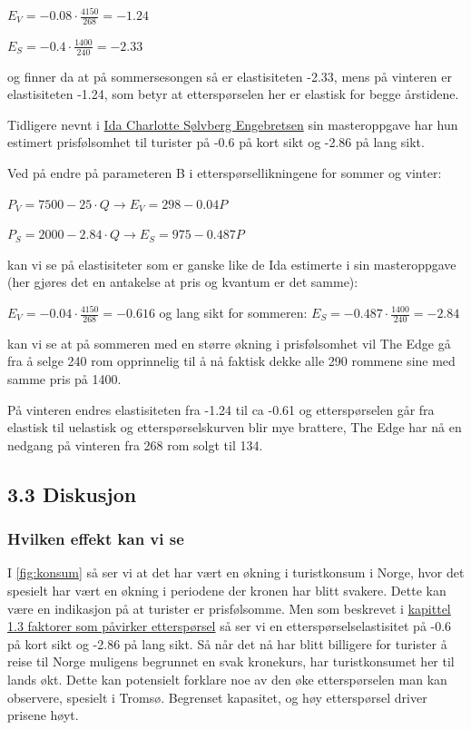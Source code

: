 \documentclass[
  12pt,
  a4paper,
  DIV=11,
  numbers=noendperiod]{scrartcl}
\begin{document}
\(E_V = -0.08 \cdot \frac{4150}{268} = -1.24\)

\(E_S = -0.4 \cdot \frac{1400}{240} = -2.33\)

og finner da at på sommersesongen så er elastisiteten -2.33, mens på
vinteren er elastisiteten -1.24, som betyr at etterspørselen her er
elastisk for begge årstidene.

Tidligere nevnt i
\href{https://ntnuopen.ntnu.no/ntnu-xmlui/bitstream/handle/11250/2486498/Masteroppgave\%20Ida\%20Charlotte\%20Engebretsen.pdf}{Ida Charlotte Sølvberg Engebretsen}
sin masteroppgave har hun estimert prisfølsomhet til turister på -0.6 på
kort sikt og -2.86 på lang sikt.

Ved på endre på parameteren B i etterspørsellikningene for sommer og
vinter:

\(P_V = 7500 - 25 \cdot Q \rightarrow E_V = 298 - 0.04P\)

\(P_S = 2000 -2.84 \cdot Q \rightarrow E_S = 975 - 0.487P\)

kan vi se på elastisiteter som er ganske like de Ida estimerte i sin
masteroppgave (her gjøres det en antakelse at pris og kvantum er det
samme):

\(E_V = -0.04 \cdot \frac{4150}{268} = -0.616\) og lang sikt for
sommeren: \(E_S = -0.487 \cdot \frac{1400}{240} = -2.84\)

kan vi se at på sommeren med en større økning i prisfølsomhet vil The
Edge gå fra å selge 240 rom opprinnelig til å nå faktisk dekke alle 290
rommene sine med samme pris på 1400.

På vinteren endres elastisiteten fra -1.24 til ca -0.61 og
etterspørselen går fra elastisk til uelastisk og etterspørselskurven
blir mye brattere, The Edge har nå en nedgang på vinteren fra 268 rom
solgt til 134.

\clearpage

\subsection{3.3 Diskusjon}\label{diskusjon}

\subsubsection{Hvilken effekt kan vi se}\label{hvilken-effekt-kan-vi-se}

I \autoref{fig:konsum} så ser vi at det har vært en økning i
turistkonsum i Norge, hvor det spesielt har vært en økning i periodene
der kronen har blitt svakere. Dette kan være en indikasjon på at
turister er prisfølsomme. Men som beskrevet i
\hyperlink{faktorer_ettersporsel}{kapittel 1.3 faktorer som påvirker etterspørsel}
så ser vi en etterspørselselastisitet på -0.6 på kort sikt og -2.86 på
lang sikt. Så når det nå har blitt billigere for turister å reise til
Norge muligens begrunnet en svak kronekurs, har turistkonsumet her til
lands økt. Dette kan potensielt forklare noe av den øke etterspørselen
man kan observere, spesielt i Tromsø. Begrenset kapasitet, og høy
etterspørsel driver prisene høyt.
\end{document}

